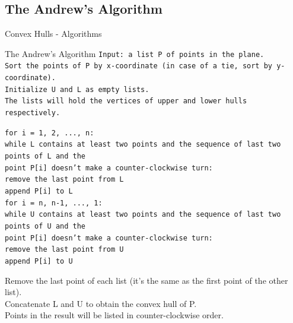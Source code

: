 \documentclass{beamer}
\begin{document}
\subsection{The Andrew's Algorithm}
\begin{frame}{Convex Hulls - Algorithms}
\begin{block}{The Andrew's Algorithm}
\fontsize{6pt}{7.2}\selectfont
\texttt{Input: a list P of points in the plane. \\
Sort the points of P by x-coordinate (in case of a tie, sort by y-coordinate). \\
Initialize U and L as empty lists. \\
The lists will hold the vertices of upper and lower hulls respectively.}
\end{block}
\begin{block}{}
\fontsize{6pt}{7.2}\selectfont
\texttt{for i = 1, 2, ..., n: \\
    \hspace*{0.5cm}while L contains at least two points and the sequence of last two points of L and the\\
			\hspace*{1.5cm}point P[i] doesn't make a counter-clockwise turn:\\
        \hspace*{1cm}remove the last point from L \\
    \hspace*{0.5cm}append P[i] to L \\ 
for i = n, n-1, ..., 1: \\
    \hspace*{0.5cm}while U contains at least two points and the sequence of last two points of U and the\\
			\hspace*{1.5cm}point P[i] doesn't make a counter-clockwise turn: \\
        \hspace*{1cm}remove the last point from U \\
    \hspace*{0.5cm}append P[i] to U}
\end{block}
\begin{block}{}
\fontsize{6pt}{7.2}\selectfont
Remove the last point of each list (it's the same as the first point of the other list). \\
Concatenate L and U to obtain the convex hull of P. \\
Points in the result will be listed in counter-clockwise order.
\end{block}
\end{frame}
\end{document}
